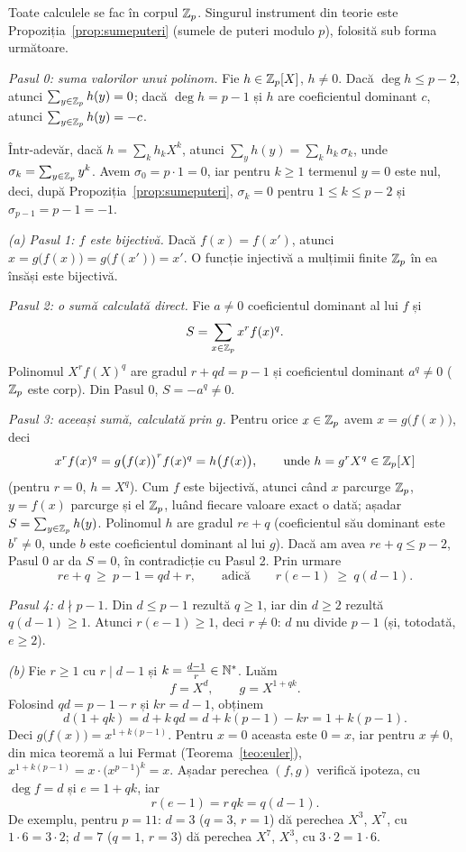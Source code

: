 \begin{solutie}
Toate calculele se fac în corpul $\mathbb{Z}_p$. Singurul instrument din teorie este Propoziția~\ref{prop:sumeputeri} (sumele de puteri modulo $p$), folosită sub forma următoare.

\smallskip
\textit{Pasul 0: suma valorilor unui polinom.} Fie $h\in\mathbb{Z}_p[X]$, $h\neq 0$. Dacă $\deg h\le p-2$, atunci $\sum_{y\in\mathbb{Z}_p}h(y)=0$; dacă $\deg h=p-1$ și $h$ are coeficientul dominant $c$, atunci $\sum_{y\in\mathbb{Z}_p}h(y)=-c$.

Într-adevăr, dacă $h=\sum_k h_kX^k$, atunci $\sum_{y}h(y)=\sum_k h_k\,\sigma_k$, unde $\sigma_k=\sum_{y\in\mathbb{Z}_p}y^k$. Avem $\sigma_0=p\cdot 1=0$, iar pentru $k\ge 1$ termenul $y=0$ este nul, deci, după Propoziția~\ref{prop:sumeputeri}, $\sigma_k=0$ pentru $1\le k\le p-2$ și $\sigma_{p-1}=p-1=-1$.

\smallskip
\textit{(a) Pasul 1: $f$ este bijectivă.} Dacă $f(x)=f(x')$, atunci $x=g\bigl(f(x)\bigr)=g\bigl(f(x')\bigr)=x'$. O funcție injectivă a mulțimii finite $\mathbb{Z}_p$ în ea însăși este bijectivă.

\smallskip
\textit{Pasul 2: o sumă calculată direct.} Fie $a\neq 0$ coeficientul dominant al lui $f$ și
\[
  S=\sum_{x\in\mathbb{Z}_p}x^{r}f(x)^{q}.
\]
Polinomul $X^{r}f(X)^{q}$ are gradul $r+qd=p-1$ și coeficientul dominant $a^{q}\neq 0$ ($\mathbb{Z}_p$ este corp). Din Pasul 0, $S=-a^{q}\neq 0$.

\smallskip
\textit{Pasul 3: aceeași sumă, calculată prin $g$.} Pentru orice $x\in\mathbb{Z}_p$ avem $x=g\bigl(f(x)\bigr)$, deci
\[
  x^{r}f(x)^{q}=g\bigl(f(x)\bigr)^{r}f(x)^{q}=h\bigl(f(x)\bigr),
  \qquad\text{unde } h=g^{r}X^{q}\in\mathbb{Z}_p[X]
\]
(pentru $r=0$, $h=X^{q}$). Cum $f$ este bijectivă, atunci când $x$ parcurge $\mathbb{Z}_p$, $y=f(x)$ parcurge și el $\mathbb{Z}_p$, luând fiecare valoare exact o dată; așadar $S=\sum_{y\in\mathbb{Z}_p}h(y)$. Polinomul $h$ are gradul $re+q$ (coeficientul său dominant este $b^{r}\neq 0$, unde $b$ este coeficientul dominant al lui $g$). Dacă am avea $re+q\le p-2$, Pasul 0 ar da $S=0$, în contradicție cu Pasul 2. Prin urmare
\[
  re+q\ \ge\ p-1=qd+r,\qquad\text{adică}\qquad r(e-1)\ \ge\ q(d-1).
\]

\smallskip
\textit{Pasul 4: $d\nmid p-1$.} Din $d\le p-1$ rezultă $q\ge 1$, iar din $d\ge 2$ rezultă $q(d-1)\ge 1$. Atunci $r(e-1)\ge 1$, deci $r\neq 0$: $d$ nu divide $p-1$ (și, totodată, $e\ge 2$).

\smallskip
\textit{(b)} Fie $r\ge 1$ cu $r\mid d-1$ și $k=\frac{d-1}{r}\in\mathbb{N}^{*}$. Luăm
\[
  f=X^{d},\qquad g=X^{1+qk}.
\]
Folosind $qd=p-1-r$ și $kr=d-1$, obținem
\[
  d(1+qk)=d+k\,qd=d+k(p-1)-kr=1+k(p-1).
\]
Deci $g\bigl(f(x)\bigr)=x^{1+k(p-1)}$. Pentru $x=0$ aceasta este $0=x$, iar pentru $x\neq 0$, din mica teoremă a lui Fermat (Teorema~\ref{teo:euler}), $x^{1+k(p-1)}=x\cdot\bigl(x^{p-1}\bigr)^{k}=x$. Așadar perechea $(f,g)$ verifică ipoteza, cu $\deg f=d$ și $e=1+qk$, iar
\[
  r(e-1)=r\,qk=q(d-1).
\]
De exemplu, pentru $p=11$: $d=3$ ($q=3$, $r=1$) dă perechea $X^{3}$, $X^{7}$, cu $1\cdot 6=3\cdot 2$; $d=7$ ($q=1$, $r=3$) dă perechea $X^{7}$, $X^{3}$, cu $3\cdot 2=1\cdot 6$.


\end{solutie}
